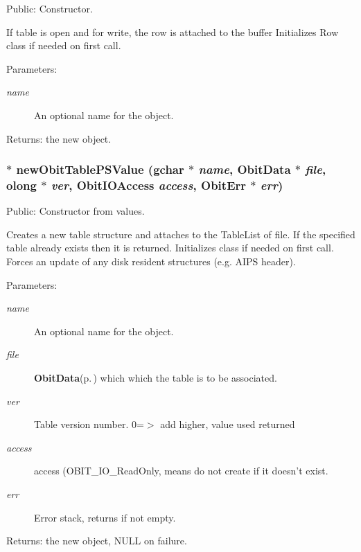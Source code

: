Public: Constructor. 

If table is open and for write, the row is attached to the buffer Initializes Row class if needed on first call. \begin{Desc}
\item[Parameters:]
\begin{description}
\item[{\em name}]An optional name for the object. \end{description}
\end{Desc}
\begin{Desc}
\item[Returns:]the new object. \end{Desc}
\subsubsection{$\ast$ new\-Obit\-Table\-PSValue (gchar $\ast$ {\em name}, {\bf Obit\-Data} $\ast$ {\em file}, {\bf olong} $\ast$ {\em ver}, Obit\-IOAccess {\em access}, {\bf Obit\-Err} $\ast$ {\em err})}\label{ObitTablePS_8h_a12}


Public: Constructor from values. 

Creates a new table structure and attaches to the Table\-List of file. If the specified table already exists then it is returned. Initializes class if needed on first call. Forces an update of any disk resident structures (e.g. AIPS header). \begin{Desc}
\item[Parameters:]
\begin{description}
\item[{\em name}]An optional name for the object. \item[{\em file}]{\bf Obit\-Data}{\rm (p.\,\pageref{structObitData})} which which the table is to be associated. \item[{\em ver}]Table version number. 0=$>$ add higher, value used returned \item[{\em access}]access (OBIT\_\-IO\_\-Read\-Only, means do not create if it doesn't exist. \item[{\em err}]Error stack, returns if not empty. \end{description}
\end{Desc}
\begin{Desc}
\item[Returns:]the new object, NULL on failure. \end{Desc}
